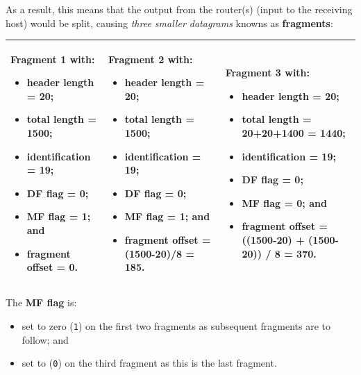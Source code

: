 \documentclass[a4paper]{systems-software}
\begin{document}
As a result, this means that the output from the router(s) (input to the receiving host) would be split, causing \textit{three smaller datagrams} knowns as \textbf{fragments}:
\begin{longtabu} to \textwidth {| X[1,l] | X[1,l] | X[1,l] |}
	\hline
	\textbf{Fragment 1} with:
	\begin{itemize}
		\item \textbf{header length} = 20;
		\item \textbf{total length} = 1500;
		\item \textbf{identification} = 19;
		\item \textbf{DF flag} = 0;
		\item \textbf{MF flag} = 1; and
		\item \textbf{fragment offset} = 0.
	\end{itemize}
	&
	\textbf{Fragment 2} with:
	\begin{itemize}
		\item \textbf{header length} = 20;
		\item \textbf{total length} = 1500;
		\item \textbf{identification} = 19;
		\item \textbf{DF flag} = 0;
		\item \textbf{MF flag} = 1; and
		\item \textbf{fragment offset} = (1500-20)/8 = 185.
	\end{itemize}
	&
	\textbf{Fragment 3} with:
	\begin{itemize}
		\item \textbf{header length} = 20;
		\item \textbf{total length} = 20+20+1400 = 1440;
		\item \textbf{identification} = 19;
		\item \textbf{DF flag} = 0;
		\item \textbf{MF flag} = 0; and
		\item \textbf{fragment offset} = ((1500-20) + (1500-20)) / 8 = 370.
	\end{itemize}
	\\ \hline
\end{longtabu}

The \textbf{MF flag} is:
\begin{itemize}
	\item set to zero (\texttt{1}) on the first two fragments as subsequent fragments are to follow; and
	\item set to (\texttt{0}) on the third fragment as this is the last fragment.
\end{itemize}
\end{document}
